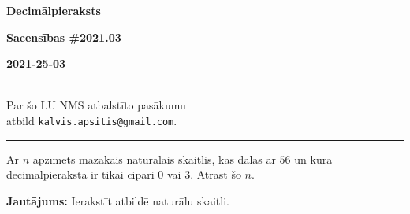 \documentclass[a4paper,12pt]{article}
\newcommand\answer[1]{}
\begin{document}
\begin{center}
\parbox{3.5cm}{\flushleft\bf Decimālpieraksts} \hfill {\bf\LARGE Sacensības \#2021.03} \hfill \parbox{3.5cm}{\flushright\bf 2021-25-03} \\[2pt]
{\rm\footnotesize Par šo LU NMS atbalstīto pasākumu\\ atbild {\tt kalvis.apsitis@gmail.com}.}
\end{center}

\hrule




\vspace{10pt}
\begin{problem}
Ar $n$ apzīmēts mazākais naturālais skaitlis, kas dalās ar $56$ un kura de\-ci\-māl\-pie\-rak\-stā ir tikai cipari $0$ vai $3$. Atrast šo $n$.

{\bf Jautājums:} Ierakstīt atbildē naturālu skaitli.
\answer{

{\bf Atbilde.} $\mathtt{3003000}$

Tā kā $56=7 \cdot 2^3$, tad ir nepieciešami un pietiekami, lai skaitlis dalītos
ar abām pirmreizinātāju pakāpēm (t.i.\ gan ar $7$, gan ar $8$). 

Lai skaitlis, kura beigās ir nepāru cipars ($3$), dalītos ar $8$, tam galā jāpieraksta trīs nulles.
Savukārt, mazākais skaitlis, kas dalās ar $7$ (no cipariem $3$ un $0$) ir $3003$.
To pārbaudām, izmēģinot dalīt $3$, $33$, $303$, $333$ ar $7$ (un pārliecināties, ka tie nedalās).\\
Tāpēc dalāmībai ar $7$ jāizvēlas nākamais mazākais skaitlis $3003$.

Tātad rezultāts ir $3003 \cdot 1000 = 3003000$.
}
\end{problem}
\end{document}
